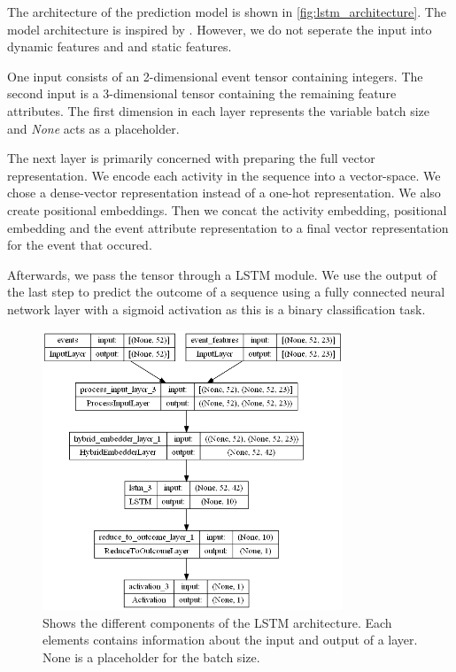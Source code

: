\documentclass[./../../paper.tex]{subfiles}
\begin{document}
The architecture of the prediction model is shown in \autoref{fig:lstm_architecture}. The model architecture is inspired by \citeauthor{hsieh_DiCE4ELInterpretingProcess_2021}. However, we do not seperate the input into dynamic features and and static features.

One input consists of an 2-dimensional event tensor containing integers. The second input is a 3-dimensional tensor containing the remaining feature attributes. The first dimension in each layer represents the variable batch size and \emph{None} acts as a placeholder.

The next layer is primarily concerned with preparing the full vector representation. We encode each activity in the sequence into a vector-space. We chose a dense-vector representation instead of a one-hot representation. We also create positional embeddings. Then we concat the activity embedding, positional embedding and the event attribute representation to a final vector representation for the event that occured.

Afterwards, we pass the tensor through a \gls{LSTM} module. We use the output of the last step to predict the outcome of a sequence using a fully connected neural network layer with a sigmoid activation as this is a binary classification task. 

\begin{figure}[htbp]
    \centering
    \includegraphics[width=0.8\textwidth]{figures/predictor50lstm.png}
    \caption{Shows the different components of the LSTM architecture. Each elements contains information about the input and output of a layer. None is a placeholder for the batch size.}
    \label{fig:lstm_architecture}
\end{figure}
\end{document}
